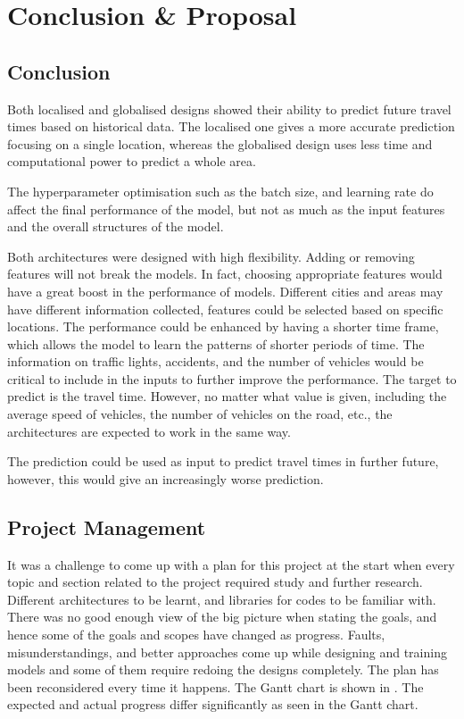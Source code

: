 \chapter{Conclusion \& Proposal} \label{Chapter:Conclusion}

\section{Conclusion}

Both localised and globalised designs showed their ability to predict future travel times based on historical data. 
The localised one gives a more accurate prediction focusing on a single location, whereas the globalised design uses less time and computational power to predict a whole area. 

The hyperparameter optimisation such as the batch size, and learning rate do affect the final performance of the model, but not as much as the input features and the overall structures of the model. 

Both architectures were designed with high flexibility. 
Adding or removing features will not break the models. In fact, choosing appropriate features would have a great boost in the performance of models. 
Different cities and areas may have different information collected, features could be selected based on specific locations. 
The performance could be enhanced by having a shorter time frame, which allows the model to learn the patterns of shorter periods of time. 
The information on traffic lights, accidents, and the number of vehicles would be critical to include in the inputs to further improve the performance. 
The target to predict is the travel time. However, no matter what value is given, including the average speed of vehicles, the number of vehicles on the road, etc., 
the architectures are expected to work in the same way. 

The prediction could be used as input to predict travel times in further future, however, this would give an increasingly worse prediction.

\section{Project Management}

It was a challenge to come up with a plan for this project at the start when every topic and section related to the project required study and further research. 
Different architectures to be learnt, and libraries for codes to be familiar with.
There was no good enough view of the big picture when stating the goals, and hence some of the goals and scopes have changed as progress. 
Faults, misunderstandings, and better approaches come up while designing and training models and some of them require redoing the designs completely. 
The plan has been reconsidered every time it happens.
The Gantt chart is shown in . The expected and actual progress differ significantly as seen in the Gantt chart. 

